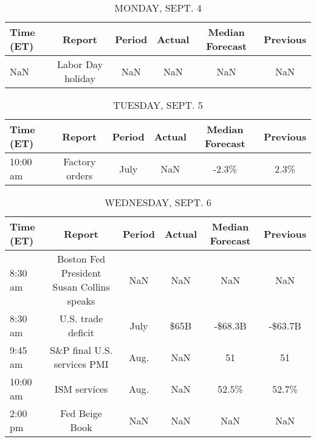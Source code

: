 \documentclass{article}%
\begin{document}
%
\normalsize%


\begin{table}[htbp]%
\caption{MONDAY, SEPT. 4}%
\centering%
\begin{adjustbox}{width=1\textwidth}%
\begin{tabular}{lccccc}
\toprule
Time (ET) &            Report & Period & Actual & Median Forecast & Previous \\
\midrule
      NaN & Labor Day holiday &    NaN &    NaN &             NaN &      NaN \\
\bottomrule
\end{tabular}
%
\end{adjustbox}%
\end{table}

%


\begin{table}[htbp]%
\caption{TUESDAY, SEPT. 5}%
\centering%
\begin{adjustbox}{width=1\textwidth}%
\begin{tabular}{lccccc}
\toprule
Time (ET) &         Report & Period & Actual & Median Forecast & Previous \\
\midrule
 10:00 am & Factory orders &   July &    NaN &           -2.3\% &     2.3\% \\
\bottomrule
\end{tabular}
%
\end{adjustbox}%
\end{table}

%


\begin{table}[htbp]%
\caption{WEDNESDAY, SEPT. 6}%
\centering%
\begin{adjustbox}{width=1\textwidth}%
\begin{tabular}{lccccc}
\toprule
Time (ET) &                                    Report & Period & Actual & Median Forecast & Previous \\
\midrule
  8:30 am & Boston Fed President Susan Collins speaks &    NaN &    NaN &             NaN &      NaN \\
  8:30 am &                        U.S. trade deficit &   July &   \$65B &         -\$68.3B &  -\$63.7B \\
  9:45 am &               S\&P final U.S. services PMI &   Aug. &    NaN &              51 &       51 \\
 10:00 am &                              ISM services &   Aug. &    NaN &           52.5\% &    52.7\% \\
  2:00 pm &                            Fed Beige Book &    NaN &    NaN &             NaN &      NaN \\
\bottomrule
\end{tabular}
%
\end{adjustbox}%
\end{table}
\end{document}
